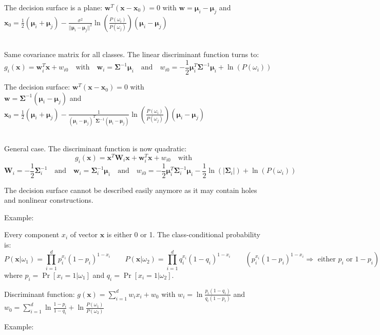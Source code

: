   The decision surface is a plane: $\mathbf{w}^T(\mathbf{x}-\mathbf{x}_0) = 0$ with $\mathbf{w} = \boldsymbol{\mu}_i - \boldsymbol{\mu}_j$ and 
  $\mathbf{x}_0 = \frac{1}{2}(\boldsymbol{\mu}_i+\boldsymbol{\mu}_j) - \frac{\sigma^2}{||\boldsymbol{\mu}_i-\boldsymbol{\mu}_j||^2} \ln\left(\frac{P(\omega_i)}{P(\omega_j)}\right) (\boldsymbol{\mu}_i-\boldsymbol{\mu}_j)$
  
  
  \\
  Same covariance matrix for all classes.
  The linear discriminant function turns to: 
  $$g_i(\mathbf{x}) = \mathbf{w}_i^T \mathbf{x} + w_{i0} \quad \text{with} \quad
  \mathbf{w}_i = \boldsymbol{\Sigma}^{-1}\boldsymbol{\mu}_i \quad \text{and} \quad
  w_{i0} = -\frac{1}{2} \boldsymbol{\mu}_i^T \boldsymbol{\Sigma}^{-1}\boldsymbol{\mu}_i + \ln(P(\omega_i))$$
  
  The decision surface: $\mathbf{w}^T(\mathbf{x}-\mathbf{x}_0) = 0$ \quad with \\
  $\mathbf{w} = \boldsymbol{\Sigma}^{-1} (\boldsymbol{\mu}_i - \boldsymbol{\mu}_j)$ \quad and \quad 
  $\mathbf{x}_0 = \frac{1}{2}(\boldsymbol{\mu}_i+\boldsymbol{\mu}_j) - \frac{1}{(\boldsymbol{\mu}_i-\boldsymbol{\mu}_j)^T \boldsymbol{\Sigma}^{-1} (\boldsymbol{\mu}_i-\boldsymbol{\mu}_j)} \ln\left(\frac{P(\omega_i)}{P(\omega_j)}\right) (\boldsymbol{\mu}_i-\boldsymbol{\mu}_j)$
  
  
  \\
  General case.
  The discriminant function is now quadratic: 
  $$g_i(\mathbf{x}) = \mathbf{x}^T \mathbf{W}_i \mathbf{x} + \mathbf{w}_i^T \mathbf{x} +w_{i0} \quad\text{with}$$
  $$\mathbf{W}_i = -\frac{1}{2} \boldsymbol{\Sigma}_{i}^{-1} \quad\text{and}\quad
  \mathbf{w}_i = \boldsymbol{\Sigma}_{i}^{-1}\boldsymbol{\mu}_i \quad\text{and}\quad
  w_{i0} = -\frac{1}{2} \boldsymbol{\mu}_i^T\boldsymbol{\Sigma}_{i}^{-1}\boldsymbol{\mu}_i - \frac{1}{2}\ln(|\boldsymbol{\Sigma}_i|) + \ln(P(\omega_i))$$
  
  The decision surface cannot be described easily anymore as it may contain holes and nonlinear constructions.
  
  Example: 
  

  Every component $x_i$ of vector $\mathbf{x}$ is either 0 or 1. The class-conditional probability is:\\
  $$P(\mathbf{x}|\omega_1)=\prod\limits_{i=1}^d p_i^{x_i}(1-p_i)^{1-x_i} \qquad P(\mathbf{x}|\omega_2) = \prod\limits_{i=1}^{d} q_i^{x_i}(1-q_i)^{1-x_i} \qquad ( p_i^{x_i}(1-p_i)^{1-x_i} \Rightarrow\text{ either }p_i\text{ or }1-p_i)$$
  where $p_i = \operatorname{Pr}\left[x_i=1|\omega_1\right]$ and $q_i = \operatorname{Pr}\left[ x_i=1 | \omega_2 \right]$.
  
  
  Discriminant function: $g(\bm x) = \sum\limits_{i=1}^d w_i x_i + w_0$ with 
  $w_i = \ln \frac{p_i(1-q_i)}{q_i(1-p_i)}$ and 
  $w_0 = \sum\limits_{i=1}^d \ln \frac{1-p_i}{1-q_i} + \ln \frac{P(\omega_1)}{P(\omega_2)}$
  
  Example: 
